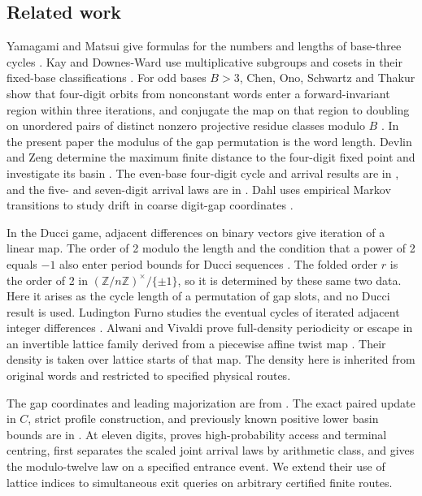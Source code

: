 \documentclass[11pt,reqno]{amsart}
\theoremstyle{definition}
\newcommand{\Z}{\mathbb Z}
\begin{document}
\subsection*{Related work}
Yamagami and Matsui give formulas for the numbers and lengths of base-three cycles \cite{YM}. Kay and Downes-Ward use multiplicative subgroups and cosets in their fixed-base classifications \cite[Sections~3--4]{KDO}\cite[Theorem~5(c), Definition~7 and Theorem~9]{KDE}. For odd bases \(B>3\), Chen, Ono, Schwartz and Thakur show that four-digit orbits from nonconstant words enter a forward-invariant region within three iterations, and conjugate the map on that region to doubling on unordered pairs of distinct nonzero projective residue classes modulo \(B\) \cite[Theorem~1]{COST}. In the present paper the modulus of the gap permutation is the word length. Devlin and Zeng determine the maximum finite distance to the four-digit fixed point and investigate its basin \cite[Theorems~1--2]{DZ}. The even-base four-digit cycle and arrival results are in \cite{G1,G2}, and the five- and seven-digit arrival laws are in \cite{G3,G5}. Dahl uses empirical Markov transitions to study drift in coarse digit-gap coordinates \cite[Sections~2--3]{Dahl}.

In the Ducci game, adjacent differences on binary vectors give iteration of a linear map. The order of 2 modulo the length and the condition that a power of 2 equals \(-1\) also enter period bounds for Ducci sequences \cite[Theorem~1.1]{BS}\cite[Propositions~2.3--2.5]{CST}\cite[Corollary~3 and Theorem~2]{Ehrlich}. The folded order \(r\) is the order of 2 in \((\Z/n\Z)^\times/\{\pm1\}\), so it is determined by these same two data. Here it arises as the cycle length of a permutation of gap slots, and no Ducci result is used. Ludington Furno studies the eventual cycles of iterated adjacent integer differences \cite{Ludington}. Alwani and Vivaldi prove full-density periodicity or escape in an invertible lattice family derived from a piecewise affine twist map \cite[Theorem~1]{AV}. Their density is taken over lattice starts of that map. The density here is inherited from original words and restricted to specified physical routes.

The gap coordinates and leading majorization are from \cite{G4}. The exact paired update in \(C\), strict profile construction, and previously known positive lower basin bounds are in \cite{G9}. At eleven digits, \cite{G6} proves high-probability access and terminal centring, \cite{G7} first separates the scaled joint arrival laws by arithmetic class, and \cite{G8} gives the modulo-twelve law on a specified entrance event. We extend their use of lattice indices to simultaneous exit queries on arbitrary certified finite routes.
\end{document}
